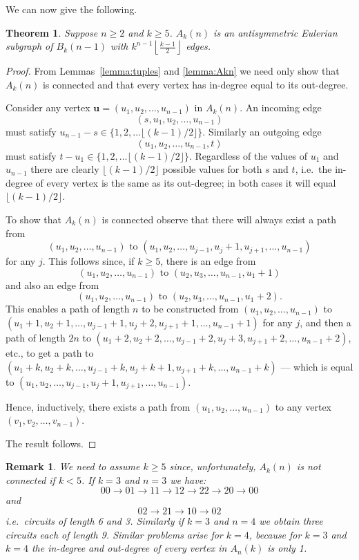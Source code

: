 \documentclass[a4paper,11pt]{article}
\newtheorem{theorem}[lemma]{Theorem}
\newtheorem{remark}[lemma]{Remark}
\begin{document}
We can now give the following.

\begin{theorem}  \label{theorem:A_n(k)_Eulerian}
Suppose $n\geq2$ and $k\geq5$.  $A_k(n)$ is an antisymmetric Eulerian subgraph of $B_{k}(n-1)$
with
$k^{n-1}\left\lfloor\frac{k-1}{2}\right\rfloor$ edges.
\end{theorem}

\begin{proof}
From Lemmas~\ref{lemma:tuples} and \ref{lemma:Akn} we need only show that $A_k(n)$ is connected
and
that every vertex has in-degree equal to its out-degree.

Consider any vertex $\mathbf{u}=(u_1,u_2,\ldots,u_{n-1})$ in $A_k(n)$. An incoming edge
\[ (s,u_1,u_2,\ldots,u_{n-1}) \]
must satisfy $u_{n-1}-s\in\{1,2,\ldots\lfloor(k-1)/2\rfloor\}$. Similarly an outgoing edge
\[(u_1,u_2,\ldots,u_{n-1},t)\]
must satisfy $t-u_1\in\{1,2,\ldots\lfloor(k-1)/2\rfloor\}$.  Regardless of the values of $u_1$ and
$u_{n-1}$ there are clearly $\lfloor(k-1)/2\rfloor$ possible values for both $s$ and $t$, i.e.\
the
in-degree of every vertex is the same as its out-degree; in both cases it will equal
$\lfloor(k-1)/2\rfloor$.

To show that $A_k(n)$ is connected observe that there will always exist a path from
\[(u_1,u_2,\ldots,u_{n-1}) \text{~to~} (u_1,u_2,\ldots,u_{j-1},u_{j}+1,u_{j+1},\ldots,u_{n-1}) \]
for any $j$.  This follows since, if $k\geq 5$, there is an edge from
\[ (u_1,u_2,\ldots,u_{n-1}) \text{~to~} (u_2,u_3,\ldots,u_{n-1},u_1+1) \]
and also an edge from
\[ (u_1,u_2,\ldots,u_{n-1}) \text{~to~} (u_2,u_3,\ldots,u_{n-1},u_1+2). \]
This enables a path of length $n$ to be constructed from $(u_1,u_2,\ldots,u_{n-1})$ to
$(u_1+1,u_2+1,\ldots,u_{j-1}+1,u_{j}+2,u_{j+1}+1,\ldots,u_{n-1}+1)$ for any $j$, and then a path
of
length $2n$ to $(u_1+2,u_2+2,\ldots,u_{j-1}+2,u_{j}+3,u_{j+1}+2,\ldots,u_{n-1}+2)$, etc., to get a
path to $(u_1+k,u_2+k,\ldots,u_{j-1}+k,u_{j}+k+1,u_{j+1}+k,\ldots,u_{n-1}+k)$ --- which is equal
to
$(u_1,u_2,\ldots,u_{j-1},u_{j}+1,u_{j+1},\ldots,u_{n-1})$.

Hence, inductively, there exists a path from $(u_1,u_2,\ldots,u_{n-1})$ to any vertex
$(v_1,v_2,\ldots,v_{n-1})$.

The result follows.
\end{proof}

\begin{remark}
We need to assume $k\geq5$ since, unfortunately, $A_k(n)$ is not connected if $k<5$.  If $k=3$ and
$n=3$ we have:
\[ 00\rightarrow01\rightarrow11\rightarrow12\rightarrow22\rightarrow20\rightarrow00 \]
and
\[ 02\rightarrow21\rightarrow10\rightarrow02 \]
i.e.\ circuits of length 6 and 3. Similarly if $k=3$ and $n=4$ we obtain three circuits each of
length 9.  Similar problems arise for $k=4$, because for $k=3$ and $k=4$ the in-degree and
out-degree of every vertex in $A_n(k)$ is only 1.
\end{remark}
\end{document}
